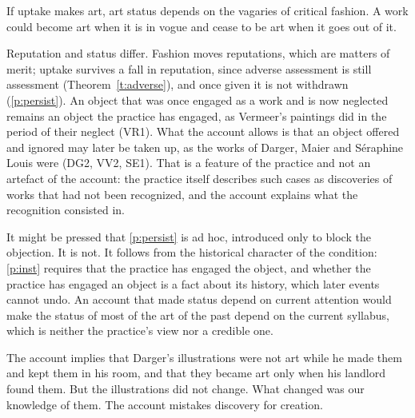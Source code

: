 \documentclass{situationist-preprint}
\begin{document}
\begin{objection}[Fashion]\label{o:fashion}
If uptake makes art, art status depends on the vagaries of critical fashion. A work could become art when it is in vogue and cease to be art when it goes out of it.
\end{objection}

\begin{reply}
Reputation and status differ. Fashion moves reputations, which are matters of merit; uptake survives a fall in reputation, since adverse assessment is still assessment (Theorem~\ref{t:adverse}), and once given it is not withdrawn (\ref{p:persist}). An object that was once engaged as a work and is now neglected remains an object the practice has engaged, as Vermeer's paintings did in the period of their neglect (VR1). What the account allows is that an object offered and ignored may later be taken up, as the works of Darger, Maier and S\'eraphine Louis were (DG2, VV2, SE1). That is a feature of the practice and not an artefact of the account: the practice itself describes such cases as discoveries of works that had not been recognized, and the account explains what the recognition consisted in.

It might be pressed that \ref{p:persist} is ad hoc, introduced only to block the objection. It is not. It follows from the historical character of the condition: \ref{p:inst} requires that the practice has engaged the object, and whether the practice has engaged an object is a fact about its history, which later events cannot undo. An account that made status depend on current attention would make the status of most of the art of the past depend on the current syllabus, which is neither the practice's view nor a credible one.
\end{reply}

\begin{objection}\label{o:outsider}
The account implies that Darger's illustrations were not art while he made them and kept them in his room, and that they became art only when his landlord found them. But the illustrations did not change. What changed was our knowledge of them. The account mistakes discovery for creation.
\end{objection}
\end{document}
